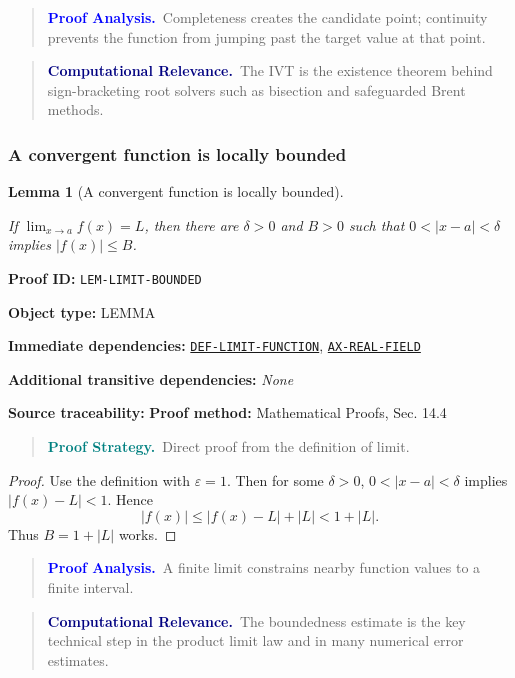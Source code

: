 \documentclass[10pt]{article}
\newcommand{\pidraw}[1]{\begingroup\urlstyle{tt}\nolinkurl{#1}\endgroup}
\newcommand{\pidref}[1]{\hyperref[prf:#1]{\pidraw{#1}}}
\newtheorem{lemma}[theorem]{Lemma}
\theoremstyle{definition}
\theoremstyle{remark}
\newenvironment{proofstrategy}
{\begin{quote}\small\noindent\textbf{\textcolor{teal}{Proof Strategy.}}\ }
{\end{quote}}
\newenvironment{proofanalysis}
{\begin{quote}\small\noindent\textbf{\textcolor{blue}{Proof Analysis.}}\ }
{\end{quote}}
\newenvironment{computationalrelevance}
{\begin{quote}\small\noindent\textbf{\textcolor{navy}{Computational Relevance.}}\ }
{\end{quote}}
\newcommand{\meta}[2]{\noindent\textbf{#1:} #2\par}
\begin{document}
\begin{proofanalysis}Completeness creates the candidate point; continuity prevents the function from jumping past the target value at that point.\end{proofanalysis}

\begin{computationalrelevance}The IVT is the existence theorem behind sign-bracketing root solvers such as bisection and safeguarded Brent methods.\end{computationalrelevance}

\subsubsection{A convergent function is locally bounded}

\begin{lemma}[A convergent function is locally bounded]\label{prf:LEM-LIMIT-BOUNDED}

If $\lim_{x\to a}f(x)=L$, then there are $\delta>0$ and $B>0$ such that
$0<|x-a|<\delta$ implies $|f(x)|\le B$.

\end{lemma}

\meta{Proof ID}{\pidraw{LEM-LIMIT-BOUNDED}}
\meta{Object type}{LEMMA}
\meta{Immediate dependencies}{\pidref{DEF-LIMIT-FUNCTION}, \pidref{AX-REAL-FIELD}}
\meta{Additional transitive dependencies}{\emph{None}}
\meta{Source traceability}{\textbf{Proof method:} Mathematical Proofs, Sec. 14.4}

\begin{proofstrategy}Direct proof from the definition of limit.\end{proofstrategy}

\begin{proof}

Use the definition with $\varepsilon=1$. Then for some $\delta>0$,
$0<|x-a|<\delta$ implies $|f(x)-L|<1$. Hence
\[
|f(x)|\le |f(x)-L|+|L|<1+|L|.
\]
Thus $B=1+|L|$ works.

\end{proof}

\begin{proofanalysis}A finite limit constrains nearby function values to a finite interval.\end{proofanalysis}

\begin{computationalrelevance}The boundedness estimate is the key technical step in the product limit law and in many numerical error estimates.\end{computationalrelevance}
\end{document}
